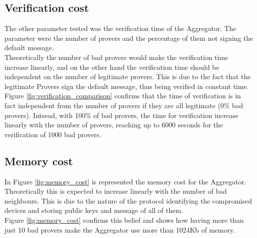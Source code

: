 \subsection{Verification cost}
The other parameter tested was the verification time of the Aggregator. 
The parameter were the number of provers and the percentage of them not signing the default message.\\
Theoretically the number of bad provers would make the verification time increase linearly, and on the other hand the verification time should be independent on the number of legitimate provers.
This is due to the fact that the legitimate Provers sign the default message, thus being verified in constant time.\\
Figure \ref{fig:verification_comparison} confirms that the time of verification is in fact independent from the number of provers if they are all legitimate (0\% bad provers).
Intsead, with 100\% of bad provers, the time for verification increase linearly with the number of provers, reaching up to 6000 seconds for the verification of 1000 bad provers.



\subsection{Memory cost}
In Figure \ref{fig:memory_cost} is represented the memory cost for the Aggregator.
Theoretically this is expected to increase linearly with the number of bad neighbours. This is due to the nature of the protocol identifying the compromised devices and storing public keys and message of all of them.\\
Figure \ref{fig:memory_cost} confirms this belief and shows how having more than just 10 bad provers make the Aggregator use more than 1024Kb of memory.\\

